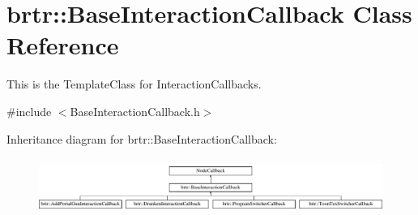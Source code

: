 \hypertarget{classbrtr_1_1_base_interaction_callback}{\section{brtr\+:\+:Base\+Interaction\+Callback Class Reference}
\label{classbrtr_1_1_base_interaction_callback}
}


This is the Template\+Class for Interaction\+Callbacks.  




{\ttfamily \#include $<$Base\+Interaction\+Callback.\+h$>$}

Inheritance diagram for brtr\+:\+:Base\+Interaction\+Callback\+:\begin{figure}[H]
\begin{center}
\leavevmode
\includegraphics[height=1.802575cm]{classbrtr_1_1_base_interaction_callback}
\end{center}
\end{figure}

